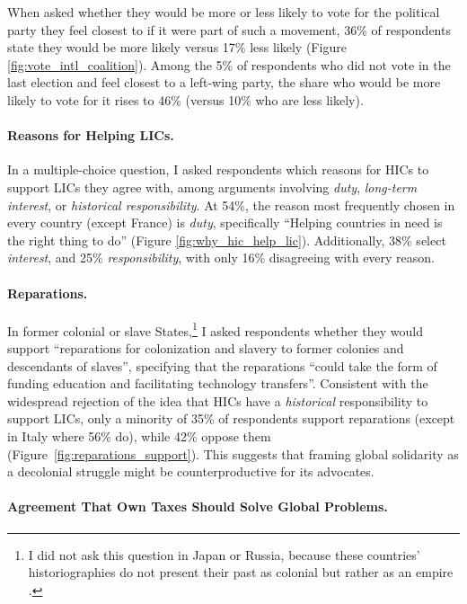 \documentclass[12pt,english]{article}
\begin{document}
When asked whether they would be more or less likely to vote for the political party they feel closest to if it were part of such a movement, 36\% of respondents state they would be more likely versus 17\% less likely (Figure \ref{fig:vote_intl_coalition}). Among the 5\% of respondents who did not vote in the last election and feel closest to a left-wing party, the share who would be more likely to vote for it rises to 46\% (versus 10\% who are less likely). 

\paragraph{Reasons for Helping LICs.}\label{par:why_help_lic}

In a multiple-choice question, I asked respondents which reasons for HICs to support LICs they agree with, among arguments involving \textit{duty}, \textit{long-term interest}, or \textit{historical responsibility}. At 54\%, the reason most frequently chosen in every country (except France) is \textit{duty}, specifically ``Helping countries in need is the right thing to do'' (Figure \ref{fig:why_hic_help_lic}). Additionally, 38\% select \textit{interest}, and 25\% \textit{responsibility}, with only 16\% disagreeing with every reason.

\paragraph{Reparations.}\label{par:reparations}

In former colonial or slave States,\footnote{I did not ask this question in Japan or Russia, because these countries' historiographies do not present their past as colonial but rather  as an empire%
.} 
I asked respondents whether they would support ``reparations for colonization and slavery to former colonies and descendants of slaves'', specifying that the reparations ``could take the form of funding education and facilitating technology transfers''. Consistent with the widespread rejection of the idea that HICs have a \textit{historical} responsibility to support LICs, only a minority of 35\% of respondents support reparations (except in Italy where 56\% do), while 42\% oppose them (Figure~\ref{fig:reparations_support}). This suggests that framing global solidarity as a decolonial struggle might be counterproductive %
for its advocates. %

\paragraph{Agreement That Own Taxes Should Solve Global Problems.}\label{par:my_tax}
\end{document}
